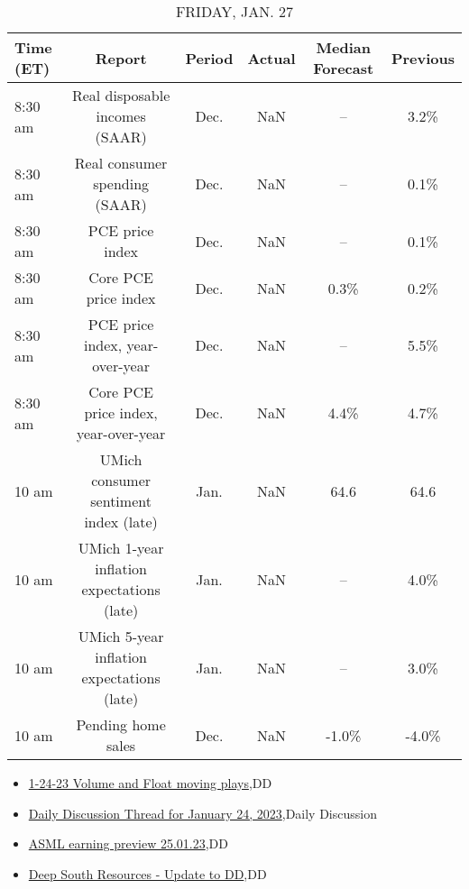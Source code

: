 \documentclass{article}%
\begin{document}
\begin{table}[htbp]%
\caption{FRIDAY, JAN. 27}%
\centering%
\begin{adjustbox}{width=1\textwidth}%
\begin{tabular}{lccccc}
\toprule
Time (ET) &                                     Report & Period & Actual & Median Forecast & Previous \\
\midrule
  8:30 am &             Real disposable incomes (SAAR) &   Dec. &    NaN &              -- &     3.2\% \\
  8:30 am &              Real consumer spending (SAAR) &   Dec. &    NaN &              -- &     0.1\% \\
  8:30 am &                            PCE price index &   Dec. &    NaN &              -- &     0.1\% \\
  8:30 am &                       Core PCE price index &   Dec. &    NaN &            0.3\% &     0.2\% \\
  8:30 am &            PCE price index, year-over-year &   Dec. &    NaN &              -- &     5.5\% \\
  8:30 am &       Core PCE price index, year-over-year &   Dec. &    NaN &            4.4\% &     4.7\% \\
    10 am &      UMich consumer sentiment index (late) &   Jan. &    NaN &            64.6 &     64.6 \\
    10 am & UMich 1-year inflation expectations (late) &   Jan. &    NaN &              -- &     4.0\% \\
    10 am & UMich 5-year inflation expectations (late) &   Jan. &    NaN &              -- &     3.0\% \\
    10 am &                         Pending home sales &   Dec. &    NaN &           -1.0\% &    -4.0\% \\
\bottomrule
\end{tabular}
%
\end{adjustbox}%
\end{table}

%
\begin{itemize}%
\item%
\href{https://reddit.com/r/wallstreetbets/comments/10k46x5/12423\_volume\_and\_float\_moving\_plays/}{1-24-23 Volume and Float moving plays},DD%
\item%
\href{https://reddit.com/r/wallstreetbets/comments/10k2x3a/daily\_discussion\_thread\_for\_january\_24\_2023/}{Daily Discussion Thread for January 24, 2023},Daily Discussion%
\item%
\href{https://reddit.com/r/wallstreetbets/comments/10k2asm/asml\_earning\_preview\_250123/}{ASML earning preview 25.01.23},DD%
\item%
\href{https://reddit.com/r/Baystreetbets/comments/10jwib7/deep\_south\_resources\_update\_to\_dd/}{Deep South Resources - Update to DD},DD%
\end{itemize}%
\end{document}
